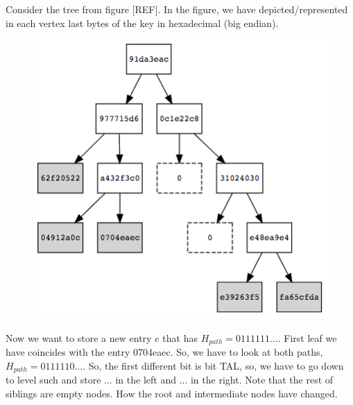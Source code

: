 Consider the tree from figure [REF]. In the figure, we have depicted/represented in each vertex last bytes of the key in hexadecimal (big endian). 

\begin{figure}[h]
	\centering
	\includegraphics[scale=0.5]{images/ex-MT-5.png}
\end{figure}

Now we want to store a new entry $e$ that has $H_{path}=0111111...$. First leaf we have coincides with the entry 0704eaec. So, we have to look at both paths, $H_{path}=0111110...$. So, the first different bit is bit TAL, so, we have to go down to level such and store ... in the left and ... in the right. Note that the rest of siblings are empty nodes. How the root and intermediate nodes have changed.

